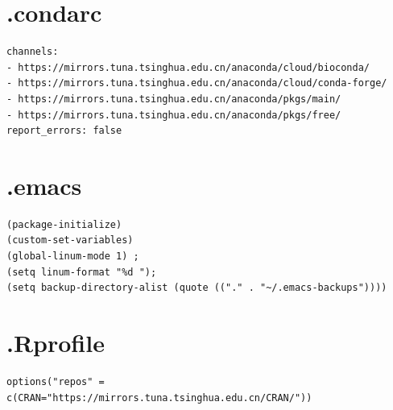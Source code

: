 \documentclass[]{article}
\begin{document}
\section{.condarc}
\begin{verbatim}
channels:
- https://mirrors.tuna.tsinghua.edu.cn/anaconda/cloud/bioconda/
- https://mirrors.tuna.tsinghua.edu.cn/anaconda/cloud/conda-forge/
- https://mirrors.tuna.tsinghua.edu.cn/anaconda/pkgs/main/
- https://mirrors.tuna.tsinghua.edu.cn/anaconda/pkgs/free/
report_errors: false
\end{verbatim}

\section{.emacs}
\begin{verbatim}
(package-initialize)
(custom-set-variables)
(global-linum-mode 1) ;
(setq linum-format "%d ");
(setq backup-directory-alist (quote (("." . "~/.emacs-backups"))))
\end{verbatim}

\section{.Rprofile}
\begin{verbatim}
options("repos" = c(CRAN="https://mirrors.tuna.tsinghua.edu.cn/CRAN/"))
\end{verbatim}
\end{document}

